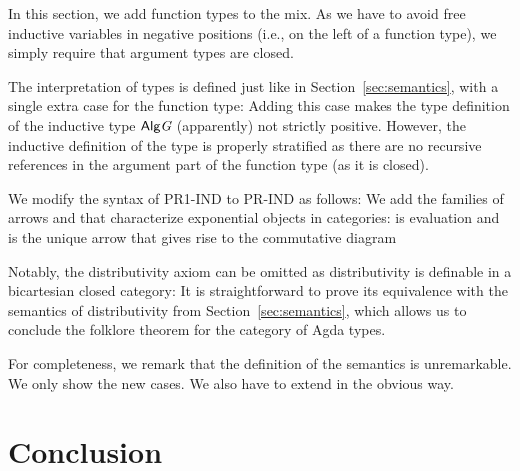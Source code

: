 \documentclass[a4paper,USenglish,cleveref, autoref, thm-restate]{lipics-v2021}
\begin{document}
In this section, we add function types to the mix. As we have to avoid
free inductive variables in negative positions (i.e., on the left of a
function type), we simply require that argument types are closed.
\cccDataTy

The interpretation of types is defined just like in
Section~\ref{sec:semantics}, with a single extra case for the function type:
\cccDataAlgArrow
Adding this case makes the type definition of the inductive type
${\AAlg{G}}$ (apparently) not strictly positive. However, the
inductive definition of the type is properly stratified as there are
no recursive references in the argument part of the function type (as
it is closed).

We modify the syntax of PR1-IND to PR-IND as follows:
\cccPRIND
We add the families of arrows {\Alam} and {\Aapply} that characterize
exponential objects in categories: {\Aapply} is evaluation and {\Alam}
is the unique arrow that gives rise to the commutative diagram
\cccExpComm

Notably, the distributivity axiom can be omitted as distributivity is
definable in a bicartesian closed category:
\cccThetaDist
It is straightforward to prove its equivalence with the semantics of
distributivity from Section~\ref{sec:semantics}, which allows us to conclude
the folklore theorem \cite{https://doi.org/10.48550/arxiv.1406.0961}
for the category of Agda types. 
\cccEvalDistEqual

For completeness, we remark that the definition of the semantics is
unremarkable. We only show the new cases.
\cccEvalExponential
We also have to extend {\Afmap} in the obvious way.

\section{Conclusion}
\label{sec:conclusion}





\end{document}
